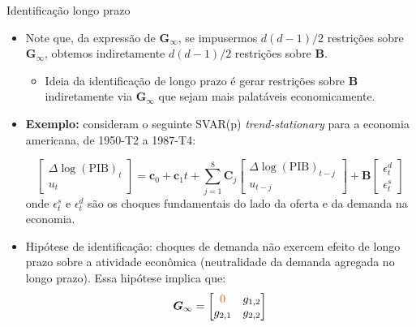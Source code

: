 \documentclass[11pt]{beamer}
\begin{document}
\begin{frame}{Identificação longo prazo}
	\begin{itemize}
	\item Note que, da expressão de $\boldsymbol{G}_\infty$, se impusermos $d(d-1)/2$ restrições sobre $\boldsymbol{G}_\infty$, obtemos indiretamente  $d(d-1)/2$ restrições sobre $\boldsymbol{B}$.
	\begin{itemize}
		\item Ideia da identificação de longo prazo é gerar restrições sobre $\boldsymbol{B}$ indiretamente via $\boldsymbol{G}_\infty$ que sejam mais palatáveis economicamente.
	\end{itemize}

			\item \textbf{Exemplo:} \citet{blanchard1989dynamic} consideram o seguinte SVAR(p) \textit{trend-stationary} para a economia americana, de 1950-T2 a 1987-T4:
			
			$$\begin{bmatrix}
				\Delta \log(\text{PIB})_t \\
				u_t  			\end{bmatrix} = \boldsymbol{c}_0 +\boldsymbol{c}_1 t + \sum_{j=1}^8\boldsymbol{C}_j \begin{bmatrix}
				\Delta \log(\text{PIB})_{t-j} \\
				u_{t-j} 			\end{bmatrix}  + \boldsymbol{B} \begin{bmatrix}
					\epsilon^d_t \\
					\epsilon^s_t
				\end{bmatrix}
$$
	onde $\epsilon^s_t$ e $\epsilon^d_t$ são os choques fundamentais do lado da oferta e da demanda na economia. 
	\item {\color{red}Hipótese de identificação:} choques de demanda não exercem efeito de longo prazo sobre a atividade econômica (neutralidade da demanda agregada no longo prazo). Essa hipótese implica que:
	$$\boldsymbol{G}_\infty  = \begin{bmatrix}
	{\color{red}0} & g_{1,2}\\
		g_{2,1} & g_{2,2}
	\end{bmatrix}$$
\end{itemize}
\end{frame}
\end{document}
